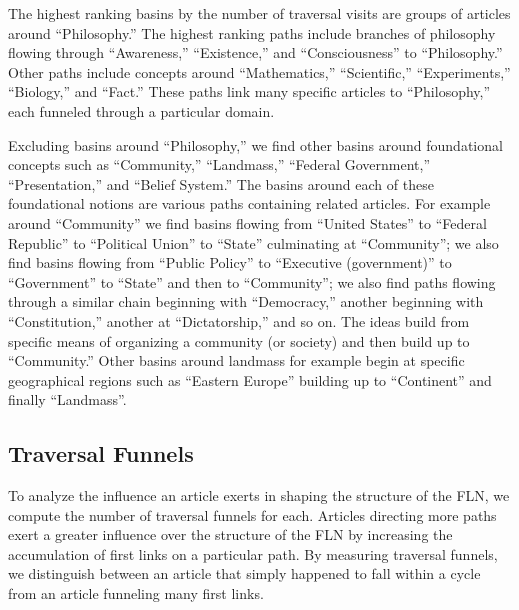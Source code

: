 \documentclass[pre,twocolumn,twoside,superscriptaddress,floatfix, aps, 10pt]{revtex4-1}
\begin{document}
The highest ranking basins by the number of traversal visits are groups of articles
around ``Philosophy.'' 
The highest ranking paths include branches of philosophy flowing through 
``Awareness,'' ``Existence,'' and ``Consciousness'' to ``Philosophy.'' Other paths
include concepts around ``Mathematics,'' ``Scientific,'' ``Experiments,'' 
``Biology,'' and ``Fact.''
These paths link many specific articles to ``Philosophy,'' each funneled through a particular domain.

Excluding basins around ``Philosophy,'' we find other basins around 
foundational concepts such as ``Community,'' ``Landmass,'' ``Federal Government,'' 
``Presentation,'' and ``Belief System.'' 
The basins around each of these foundational notions are 
various paths containing related articles. For example around 
``Community'' we find basins
flowing from ``United States'' to ``Federal Republic'' to ``Political Union'' to ``State'' culminating at ``Community''; we also find basins flowing from 
``Public Policy'' to ``Executive (government)'' to ``Government'' to ``State'' and then 
to ``Community''; we also find paths flowing through a similar chain beginning
with ``Democracy,'' another beginning with ``Constitution,'' another at 
``Dictatorship,'' and so on. The ideas build from specific means of organizing
a community (or society) and then build up to ``Community.'' 
Other basins around landmass for example begin at specific geographical regions
such as ``Eastern Europe'' building up to ``Continent'' and finally ``Landmass''.


\subsection{Traversal Funnels}

To analyze the influence an article exerts in shaping the 
structure of the FLN, we compute the number of traversal funnels for each.
Articles directing more paths exert a greater influence over the structure
of the FLN by increasing the accumulation of first links
on a particular path. By measuring traversal funnels, we distinguish between an article that simply happened to fall within a cycle from an article funneling 
many first links.
\end{document}
